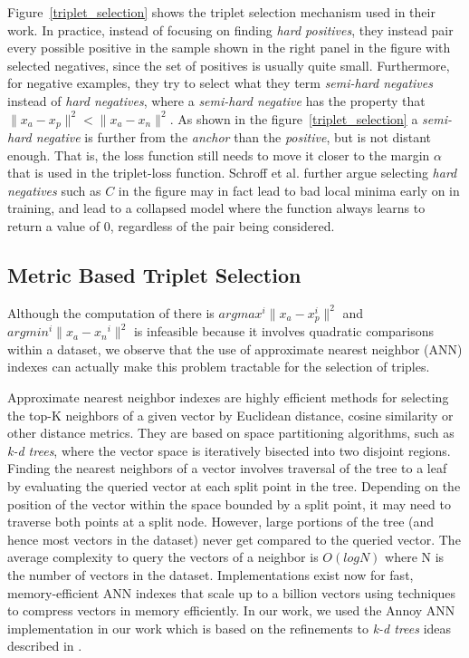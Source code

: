 Figure~\ref{triplet_selection} shows the triplet selection mechanism used in their work.  In practice, instead of focusing on finding \textit{hard positives}, they instead pair every possible positive in the sample shown in the right panel in the figure with selected negatives, since the set of positives is usually quite small.  Furthermore, for negative examples, they try to select what they term \textit{semi-hard negatives} instead of \textit{hard negatives}, where a \textit{semi-hard negative} has the property that $\|x_a - x_p \|^2 < \|x_a - x_n \|^2$.  As shown in the figure~\ref{triplet_selection} a \textit{semi-hard negative} is further from the \textit{anchor} than the \textit{positive}, but is not distant enough.  That is, the loss function still needs to move it closer to the margin $\alpha$ that is used in the triplet-loss function.  Schroff et al. further argue selecting \textit{hard negatives} such as $C$ in the figure may in fact lead to bad local minima early on in training, and lead to a collapsed model where the function always learns to return a value of 0, regardless of the pair being considered.

\subsection{Metric Based Triplet Selection}
Although the computation of there is $argmax^i \| x_{a} - x_{p}^i \|^2$ and $argmin^i \| x_{a} - x{_n}^i \|^2$ is infeasible because it involves quadratic comparisons within a dataset, we observe that the use of approximate nearest neighbor (ANN) indexes can actually make this problem tractable for the selection of triples.  

Approximate nearest neighbor indexes are highly efficient methods for selecting the top-K neighbors of a given vector by Euclidean distance, cosine similarity or other distance metrics.  They are based on space partitioning algorithms, such as \textit{k-d trees}, where the vector space is iteratively bisected into two disjoint regions.  Finding the nearest neighbors of a vector involves traversal of the tree to a leaf by evaluating the queried vector at each split point in the tree.  Depending on the position of the vector within the space bounded by a split point, it may need to traverse both points at a split node.  However, large portions of the tree (and hence most vectors in the dataset) never get compared to the queried vector.  The average complexity to query the vectors of a neighbor is $O(log N)$ where N is the number of vectors in the dataset.  Implementations exist now for fast, memory-efficient ANN indexes that scale up to a billion vectors \cite{JDH17} using techniques to compress vectors in memory efficiently.  In our work, we used the Annoy ANN implementation \cite{annoy_git} in our work which is based on the refinements to \textit{k-d trees} ideas described in \cite{ann_paper}.

